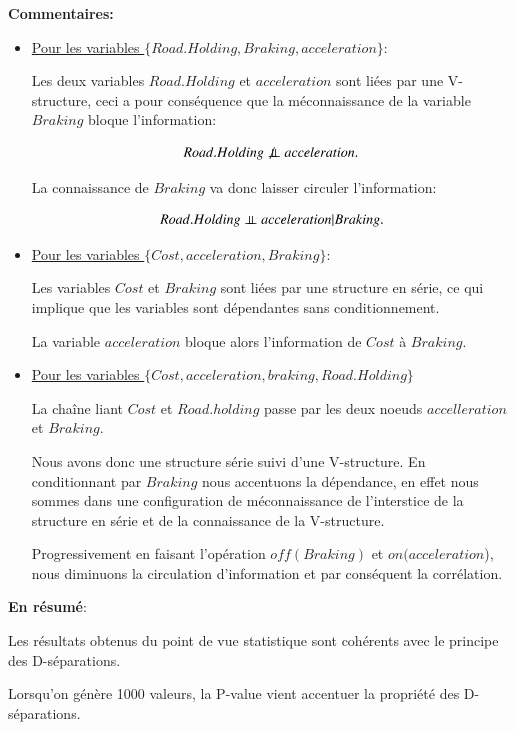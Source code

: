 \documentclass[a4paper]{article}
\begin{document}
\textbf{Commentaires:}
\begin{itemize}
  \item \underline{Pour les variables  $\{Road.Holding,Braking,acceleration\}$}:{\\}


Les deux variables $ Road.Holding$ et $acceleration$ sont liées par une V-structure, ceci a pour conséquence que la méconnaissance de la variable $Braking$ bloque l'information:

 $$Road.Holding \not\perp\!\!\!\perp  acceleration.$$

 La connaissance de $Braking$ va donc  laisser circuler l'information:

 $$ Road.Holding  \perp\!\!\!\perp  acceleration  | Braking.$$


\item\underline{ Pour les variables $\{Cost,acceleration,Braking\}$}:{\\}


Les variables $Cost$ et $Braking$ sont liées par une structure en série, ce qui implique que les variables  sont dépendantes sans conditionnement.

La variable $acceleration$ bloque alors l'information de $Cost$ à $Braking$.

\item\underline{ Pour les variables $\{Cost,acceleration,braking,Road.Holding\}$}{\\}


La chaîne liant $Cost$ et $Road.holding$ passe par les deux noeuds $accelleration$ et $ Braking$.

Nous avons donc une structure série suivi d'une V-structure.
En conditionnant  par $Braking$ nous accentuons la dépendance, en effet  nous sommes dans une configuration de méconnaissance de l'interstice de la structure en série  et de la connaissance de la V-structure.

Progressivement en faisant l'opération $off(Braking)$ et $on(acceleration$), nous diminuons la circulation d'information et par conséquent la corrélation.
\end{itemize}

\textbf{En résumé}:

Les résultats obtenus du point de vue statistique sont cohérents avec le principe des D-séparations.

Lorsqu'on génère 1000 valeurs, la P-value vient accentuer la propriété des D-séparations.
\end{document}
